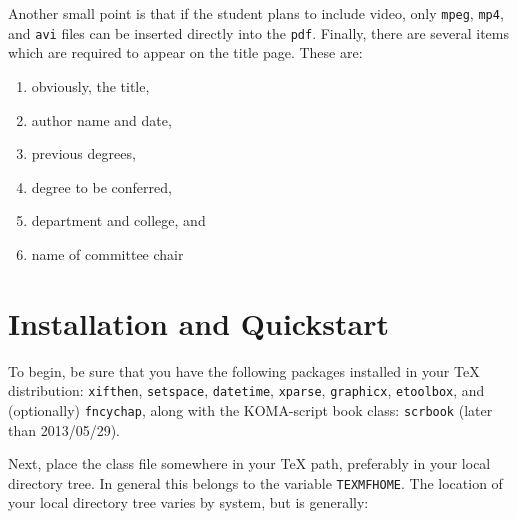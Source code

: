 \documentclass{article}
\begin{document}
Another small point is that if the student plans to include video, only \verb!mpeg!, \verb!mp4!, and \verb!avi! files can be inserted directly into the \verb!pdf!.
Finally, there are several items which are required to appear on the title page. These are:
\begin{multicols}{2}
  \begin{enumerate}\itemsep0pt
  \item obviously, the title,
  \item author name and date,
  \item previous degrees,
  \item degree to be conferred,
  \item department and college, and
  \item name of committee chair
  \end{enumerate}
\end{multicols}

\section{Installation and Quickstart}
\label{sec:inst-quickst}

To begin, be sure that you have the following 
packages installed in your \TeX{} distribution:
\verb!xifthen!, \verb!setspace!, \verb!datetime!, \verb!xparse!, \verb!graphicx!,
\verb!etoolbox!,
and (optionally) \verb!fncychap!, along with the 
KOMA-script book class: \verb!scrbook! (later than 2013/05/29).

Next, place the class file somewhere in your 
\TeX{} path, preferably in your local directory tree.
In general this belongs to the variable \verb!TEXMFHOME!.
The location of your local directory tree varies
by system, but is generally:
\end{document}
